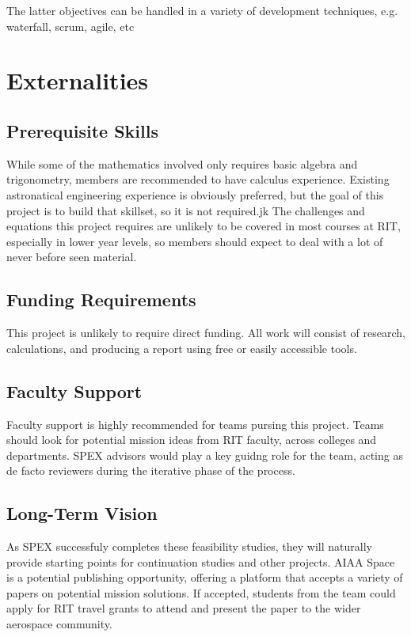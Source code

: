 \documentclass[conference]{IEEEtran} %
\begin{document}
The latter objectives can be handled in a variety of development techniques, e.g. waterfall, scrum, agile, etc
\section{Externalities}
\subsection{Prerequisite Skills}
While some of the mathematics involved only requires basic algebra and trigonometry, members are recommended to have calculus experience.
Existing astronatical engineering experience is obviously preferred, but the goal of this project is to build that skillset, so it is not required.jk
The challenges and equations this project requires are unlikely to be covered in most courses at RIT, especially in lower year levels, so members should expect to deal with a lot of never before seen material.

\subsection{Funding Requirements}
This project is unlikely to require direct funding. All work will consist of research, calculations, and producing a report using free or easily accessible tools.

\subsection{Faculty Support}
Faculty support is highly recommended for teams pursing this project.
Teams should look for potential mission ideas from RIT faculty, across colleges and departments.
SPEX advisors would play a key guidng role for the team, acting as de facto reviewers during the iterative phase of the process.
\subsection{Long-Term Vision}
\label{sec:vision}
As SPEX successfuly completes these feasibility studies, they will naturally provide starting points for continuation studies and other projects.
AIAA Space is a potential publishing opportunity, offering a platform that accepts a variety of papers on potential mission solutions.
If accepted, students from the team could apply for RIT travel grants to attend and present the paper to the wider aerospace community.
\end{document}
